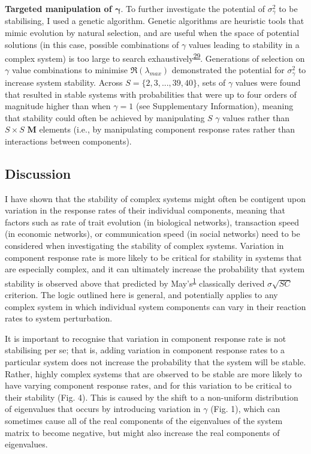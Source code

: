\documentclass[]{article}
\begin{document}
\textbf{Targeted manipulation of \(\mathbf{\gamma}\)}. To further
investigate the potential of \(\sigma^{2}_{\gamma}\) to be stabilising,
I used a genetic algorithm. Genetic algorithms are heuristic tools that
mimic evolution by natural selection, and are useful when the space of
potential solutions (in this case, possible combinations of \(\gamma\)
values leading to stability in a complex system) is too large to search
exhaustively\textsuperscript{\protect\hyperlink{ref-Hamblin2013}{29}}.
Generations of selection on \(\gamma\) value combinations to minimise
\(\Re(\lambda_{max})\) demonstrated the potential for
\(\sigma^{2}_{\gamma}\) to increase system stability. Across
\(S = \{2, 3, ..., 39, 40\}\), sets of \(\gamma\) values were found that
resulted in stable systems with probabilities that were up to four
orders of magnitude higher than when \(\gamma = 1\) (see Supplementary
Information), meaning that stability could often be achieved by
manipulating \(S\) \(\gamma\) values rather than \(S \times S\)
\(\mathbf{M}\) elements (i.e., by manipulating component response rates
rather than interactions between components).

\subsection{Discussion}\label{discussion}

I have shown that the stability of complex systems might often be
contigent upon variation in the response rates of their individual
components, meaning that factors such as rate of trait evolution (in
biological networks), transaction speed (in economic networks), or
communication speed (in social networks) need to be considered when
investigating the stability of complex systems. Variation in component
response rate is more likely to be critical for stability in systems
that are especially complex, and it can ultimately increase the
probability that system stability is observed above that predicted by
May's\textsuperscript{\protect\hyperlink{ref-May1972}{1}} classically
derived \(\sigma \sqrt{SC}\) criterion. The logic outlined here is
general, and potentially applies to any complex system in which
individual system components can vary in their reaction rates to system
perturbation.

It is important to recognise that variation in component response rate
is not stabilising per se; that is, adding variation in component
response rates to a particular system does not increase the probability
that the system will be stable. Rather, highly complex systems that are
observed to be stable are more likely to have varying component response
rates, and for this variation to be critical to their stability (Fig.
4). This is caused by the shift to a non-uniform distribution of
eigenvalues that occurs by introducing variation in \(\gamma\) (Fig. 1),
which can sometimes cause all of the real components of the eigenvalues
of the system matrix to become negative, but might also increase the
real components of eigenvalues.
\end{document}

